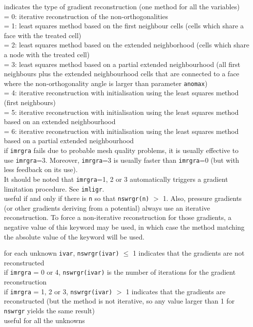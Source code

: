 {indicates the type of gradient reconstruction (one method for all the
variables)\\
\hspace*{1.3cm}= 0: iterative reconstruction of the non-orthogonalities\\
\hspace*{1.3cm}= 1: least squares method based on the first neighbour cells
(cells which share a face with the treated cell)\\
\hspace*{1.3cm}= 2: least squares method based on the extended neighborhood
(cells which share a node with the treated cell)\\
\hspace*{1.3cm}= 3: least squares method based on a partial extended
neighbourhood (all first neighbours plus the extended neighbourhood cells that
are connected to a face where the non-orthogonality angle is larger than
parameter {\tt anomax})\\
\hspace*{1.3cm}= 4: iterative reconstruction with initialisation using the least
squares method (first neighbours)\\
\hspace*{1.3cm}= 5: iterative reconstruction with initialisation using the least
squares method based on an extended neighbourhood\\
\hspace*{1.3cm}= 6: iterative reconstruction with initialisation using the least
squares method based on a partial extended neighbourhood\\
if {\tt imrgra} fails due to probable mesh quality problems, it is usually effective
to use {\tt imrgra}=3. Moreover, {\tt imrgra}=3 is usually faster than
{\tt imrgra}=0 (but with less feedback on its use).\\
It should be noted that {\tt imrgra}=1, 2 or 3 automatically triggers a gradient
limitation procedure. See {\tt imligr}.\\
useful if and only if there is {\tt n} so that {\tt nswrgr(n)} $>$ 1.
Also, pressure gradients (or other gradients deriving from a potential)
always use an iterative reconstruction. To force a non-iterative
reconstruction for those gradients, a negative value of this keyword may be
used, in which case the method matching the absolute value of the keyword will
be used.}

{for each unknown {\tt ivar}, {\tt nswrgr(ivar)} $\leqslant$ 1 indicates that the
gradients are not reconstructed\\
\hspace*{1.3cm}if {\tt imrgra} = 0 or 4, {\tt nswrgr(ivar)} is the number of
iterations for the gradient reconstruction\\
\hspace*{1.3cm}if {\tt imrgra} = 1, 2 or 3, {\tt nswrgr(ivar)} $>$ 1 indicates that
the gradients are reconstructed (but the method is not iterative, so any value
larger than 1 for {\tt nswrgr} yields the same result)\\
useful for all the unknowns}

